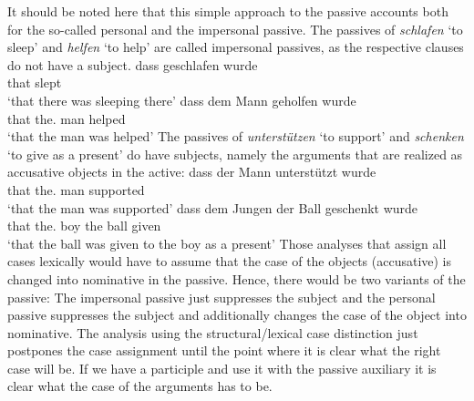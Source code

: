 It should be noted here that this simple approach to the passive accounts both for the so-called
personal and the impersonal passive. The passives of \emph{schlafen} `to sleep' and \emph{helfen}
`to help' are called impersonal passives, as the respective clauses do not have a subject. 
\eal
\ex 
\gll dass geschlafen wurde\\
     that slept      \AUX\\
\glt `that there was sleeping there'
\ex
\gll dass dem Mann geholfen wurde\\
     that the.\DAT{} man helped \AUX\\
\glt `that the man was helped'
\zl
The passives of \emph{unterstützen} `to support' and \emph{schenken} `to give as a present' do have
subjects, namely the arguments that are realized as accusative objects in the active:
\eal
\ex 
\gll dass der Mann unterstützt wurde\\
     that the.\NOM{} man supported \AUX\\
\glt `that the man was supported'
\ex
\gll dass dem Jungen der Ball geschenkt wurde\\
     that the.\DAT{} boy the\NOM{} ball given \AUX\\
\glt `that the ball was given to the boy as a present'
\zl
Those analyses that assign all cases lexically would have to assume that the case of the objects
(accusative) is changed into nominative in the passive. Hence, there would be two variants of the
passive: The impersonal passive just suppresses the subject and the personal passive suppresses the
subject and additionally changes the case of the object into nominative. The analysis using the
structural/lexical case distinction just postpones the case assignment until the point where it is
clear what the right case will be. If we have a participle and use it with the passive auxiliary it
is clear what the case of the arguments has to be.





